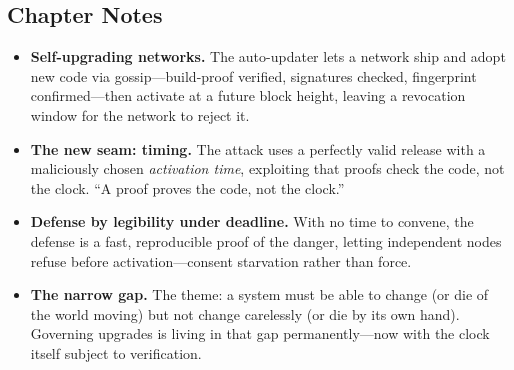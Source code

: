 \hypertarget{chapter-18-notes}{%
\subsection{Chapter Notes}\label{chapter-18-notes}}

\begin{itemize}
\tightlist
\item
  \textbf{Self-upgrading networks.} The auto-updater lets a network ship and adopt
  new code via gossip---build-proof verified, signatures checked, fingerprint
  confirmed---then activate at a future block height, leaving a revocation window
  for the network to reject it.
\item
  \textbf{The new seam: timing.} The attack uses a perfectly valid release with a
  maliciously chosen \emph{activation time}, exploiting that proofs check the code,
  not the clock. ``A proof proves the code, not the clock.''
\item
  \textbf{Defense by legibility under deadline.} With no time to convene,
  the defense is a fast, reproducible proof of the danger, letting independent
  nodes refuse before activation---consent starvation rather than force.
\item
  \textbf{The narrow gap.} The theme: a system must be able to change (or die of
  the world moving) but not change carelessly (or die by its own hand). Governing
  upgrades is living in that gap permanently---now with the clock itself subject to
  verification.
\end{itemize}
